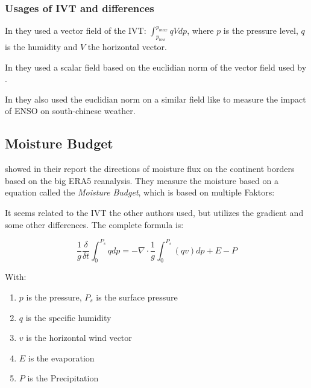 \subsubsection{Usages of IVT and differences}

In \cite{ralph_dropsonde_2017} they used a vector field of the IVT: $\int_{p_{low}}^{p_{max}} qV dp$, where $p$ is the pressure level, $q$ is the humidity and $V$ the horizontal vector.

In \cite{sousa_north_2020} they used a scalar field based on the euclidian norm of the vector field used by \cite{ralph_dropsonde_2017}.


In \cite{ayantobo_integrated_2022} they also used the euclidian norm on a similar field like \cite{ralph_dropsonde_2017} to measure the impact of  ENSO on south-chinese weather.

\subsection{Moisture Budget}

\citeauthor{yang_moisture_2022} showed in their report \cite{yang_moisture_2022} the directions of moisture flux on the continent borders based on the big ERA5 reanalysis.
They measure the moisture based on a equation called the \textit{Moisture Budget}, which is based on multiple Faktors: 



It seems related to the IVT the other authors used, but utilizes the gradient and some other differences. The complete formula is:

$$
\frac{1}{g} \frac{\delta}{\delta t} \int^{P_s}_0 q dp = - \nabla \cdot \frac{1}{g} \int^{P_s}_0 (qv) dp + E - P
$$

With: 

\begin{enumerate}
  \item $p$ is the pressure, $P_s$ is the surface pressure
  \item $q$ is the specific humidity
  \item $v$ is the horizontal wind vector
  \item $E$ is the evaporation
  \item $P$ is the Precipitation
\end{enumerate}


